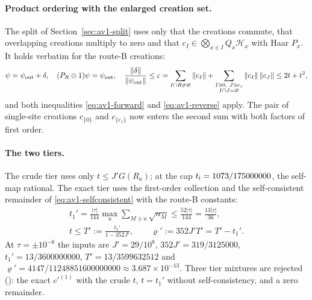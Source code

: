 \paragraph{Product ordering with the enlarged creation set.}
The split of Section~\ref{sec:av1-split} uses only that the creations commute,
that overlapping creations multiply to zero and that
$c_I\in\bigotimes_{x\in I}Q_x\mathcal H_x$ with Haar $P_x$. It holds verbatim
for the route-B creations:
\begin{equation}
 \psi=\psi_{\rm out}+\delta,\quad(P_R\otimes1)\psi=\psi_{\rm out},\quad
 \frac{\left\lVert\delta\right\rVert}{\left\lVert\psi_{\rm out}\right\rVert}\le\varepsilon
 =\sum_{I\cap R\ne\varnothing}\left\lVert c_I\right\rVert
 +\sum_{\substack{I\ni0,\ J\ni e_z\\ I\cap J=\varnothing}}\left\lVert c_I\right\rVert\left\lVert c_J\right\rVert
 \le2t+t^2 ,
 \label{eq:ax1-split}
\end{equation}
and both inequalities \eqref{eq:av1-forward} and \eqref{eq:av1-reverse}
apply. The pair of single-site creations $c_{\{0\}}$ and $c_{\{e_z\}}$ now
enters the second sum with both factors of first order.

\paragraph{The two tiers.}
The crude tier uses only $t\le J'G(R_a)$; at the cap $t_{\rm i}=1073/175000000$,
the self-map rational. The exact tier uses the first-order collection and the
self-consistent remainder of \eqref{eq:av1-selfconsistent} with the route-B
constants:
\begin{equation}
 \begin{gathered}
 t_1'=\frac{|\tau|}{144}\max_u\sum_{M\ni u}\sqrt{n_M}\le\frac{52|\tau|}{144}
 =\frac{13|\tau|}{36},\\
 t\le T':=\frac{t_1'}{1-352J'},\qquad
 \varrho':=352J'T'=T'-t_1' .
 \end{gathered}
 \label{eq:ax1-T}
\end{equation}
At $\tau=\pm10^{-8}$ the inputs are $J'=29/10^8$, $352J'=319/3125000$,
$t_1'=13/3600000000$, $T'=13/3599632512$ and
$\varrho'=4147/11248851600000000\approx3.687\times10^{-13}$. Three tier
mixtures are rejected (): the exact $c'^{(1)}$
with the crude $t$, $t=t_1'$ without self-consistency, and a zero remainder.

